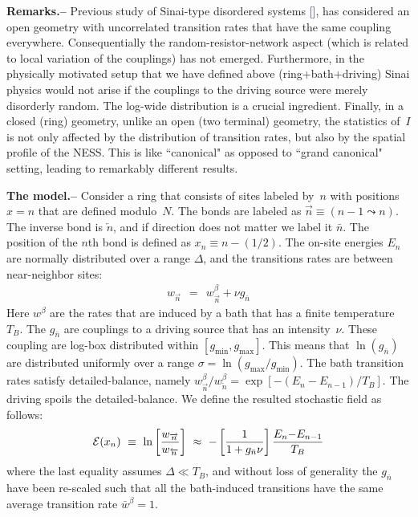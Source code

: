 \documentclass[aps,prl,floats,floatfix,twocolumn]{revtex4}
\newcommand{\mylabel}[1]{\label{#1}}
\newcommand{\beq}{\begin{eqnarray}}
\newcommand{\eeq}{\end{eqnarray}}
\newcommand{\be}[1]{\begin{eqnarray}\ifthenelse{#1=-1}
{\nonumber}{\ifthenelse{#1=0}{}{\mylabel{e#1}}}}
\newcommand{\ee}{\end{eqnarray}}
\newcommand{\sect}[1]{{\bf #1.-- }}
\renewcommand{\cite}[1]{\textcolor{blue}{[\onlinecite{#1}}]} %
\begin{document}
\sect{Remarks}
%
% 
Previous study of Sinai-type disordered systems \cite{sinai2}, 
has considered an open geometry with uncorrelated transition rates 
that have the same coupling everywhere. Consequentially 
the random-resistor-network aspect (which is related to local 
variation of the couplings) has not emerged.
% 
%
Furthermore, in the physically motivated setup that we have 
defined above (ring+bath+driving) Sinai physics would not arise 
if the couplings to the driving source were merely disorderly random. 
The log-wide distribution is a crucial ingredient. 
%
Finally, in a closed (ring) geometry, unlike an open (two terminal) geometry, 
the statistics of~$I$ is not only affected by the distribution of transition rates, 
but also by the spatial profile of the NESS. 
This is like ``canonical" as opposed to ``grand canonical" setting, 
leading to remarkably different results.
 
\clearpage

\sect{The model}
%
%
Consider a ring that consists of sites labeled by~$n$ 
with positions ${x=n}$ that are defined modulo~$N$. 
The bonds are labeled as ${\overrightarrow{n}\equiv(n{-}1 \leadsto n)}$.
The inverse bond is $\overleftarrow{n}$, and if direction does 
not matter we label it $\bar{n}$. The position of the $n$th bond 
is defined as $x_n \equiv n{-}(1/2)$. The on-site energies $E_n$ 
are normally distributed over a range $\Delta$,  
and the transitions rates are between near-neighbor sites:   
%
\beq
w_{\overrightarrow{n}} \ \ = \ \ w^{\beta}_{\overrightarrow{n}} + \nu g_{\bar{n}}
\eeq 
%
Here $w^{\beta}$ are the rates that are induced by a bath that has 
a finite temperature $T_B$. The $g_{\bar{n}}$ are 
couplings to a driving source that has an intensity~$\nu$. 
These coupling are log-box distributed within ${[g_{\text{min}},g_{\text{max}}]}$.
This means that $\ln(g_{\bar{n}})$ are distributed uniformly 
over a range ${\sigma=\ln(g_{\text{max}}/g_{\text{min}})}$. 
%
The bath transition rates satisfy detailed-balance, 
namely $w^{\beta}_{\overrightarrow{n}}/w^{\beta}_{\overleftarrow{n}} = \exp[-(E_{n}{-}E_{n{-}1})/T_B]$.
The driving spoils the detailed-balance. We define the resulted 
stochastic field as follows:
%
\be{100}
\mathcal{E}(x_n) \ \equiv \ \ln \left[\frac{w_{\overrightarrow{n}}}{w_{\overleftarrow{n}}}\right] 
\ \approx \ - \left[ \frac{1}{1+g_{\bar{n}}\nu} \right] \frac{E_n{-}E_{n{-}1}}{T_B}
\ee
%
where the last equality assumes ${\Delta \ll T_B}$,  
and without loss of generality the $g_{\bar{n}}$ have been re-scaled 
such that all the bath-induced transitions have 
the same average transition rate ${\bar{w}^{\beta}=1}$. 
\end{document}
